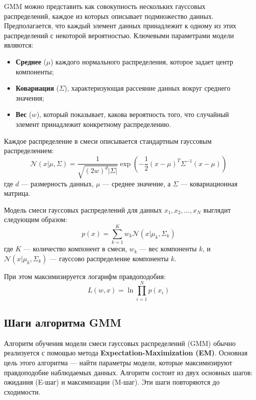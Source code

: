 GMM можно представить как совокупность нескольких гауссовых распределений, каждое из которых описывает подмножество данных. Предполагается, что каждый элемент данных принадлежит к одному из этих распределений с некоторой вероятностью. Ключевыми параметрами модели являются:
\begin{itemize}
    \item \textbf{Среднее} ($\mu$) каждого нормального распределения, которое задает центр компоненты;
    \item \textbf{Ковариация} ($\Sigma$), характеризующая рассеяние данных вокруг среднего значения;
    \item \textbf{Вес} ($w$), который показывает, какова вероятность того, что случайный элемент принадлежит конкретному распределению.
\end{itemize}

Каждое распределение в смеси описывается стандартным гауссовым распределением:
\[
    \mathcal{N}(x | \mu, \Sigma) = \frac{1}{\sqrt{(2 w)^d |\Sigma|}} \exp \left( -\frac{1}{2} (x - \mu)^T \Sigma^{-1} (x - \mu) \right)
\]
где $d$ — размерность данных, $\mu$ — среднее значение, а $\Sigma$ — ковариационная матрица.

Модель смеси гауссовых распределений для данных $x_1, x_2, \dots, x_N$ выглядит следующим образом:
\[
    p(x) = \sum_{k=1}^{K} w_k \mathcal{N}(x | \mu_k, \Sigma_k)
\]
где $K$ — количество компонент в смеси, $w_k$ — вес компоненты $k$, и $\mathcal{N}(x | \mu_k, \Sigma_k)$ — гауссово распределение компоненты $k$.

При этом максимизируется логарифм правдоподобия:
\[
    L(w, x) = \ln \prod_{i=1}^N p(x_i)
\]


\subsection{Шаги алгоритма GMM}

Алгоритм обучения модели смеси гауссовых распределений (GMM) обычно реализуется с помощью метода \textbf{Expectation-Maximization (EM)}. Основная цель этого алгоритма — найти параметры модели, которые максимизируют правдоподобие наблюдаемых данных. Алгоритм состоит из двух основных шагов: ожидания (E-шаг) и максимизации (M-шаг). Эти шаги повторяются до сходимости.

